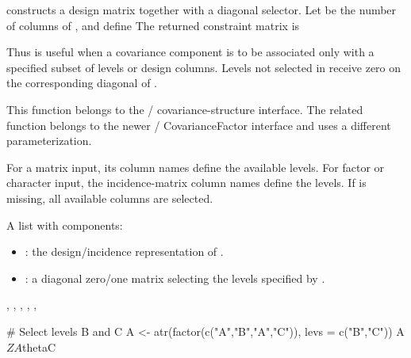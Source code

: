 \documentclass[a4paper]{book}
\begin{document}
\begin{Details}\relax
{} constructs a design matrix  together with a diagonal  selector. Let  be the number of columns of , and define
The returned constraint matrix is

Thus  is useful when a covariance component is to be associated only with a specified subset of levels or design columns. Levels not selected in  receive zero on the corresponding diagonal of .

This function belongs to the / covariance-structure interface. The related  function belongs to the newer / CovarianceFactor interface and uses a different parameterization.

For a matrix input, its column names define the available levels. For factor or character input, the incidence-matrix column names define the levels. If  is missing, all available columns are selected.
\end{Details}
%
\begin{Value}
A list with components:
\begin{itemize}

\item{} : the design/incidence representation of .
\item{} : a diagonal zero/one matrix selecting the levels specified by .

\end{itemize}

\end{Value}
%
\begin{SeeAlso}\relax
{}, , , ,
, 
\end{SeeAlso}
%
\begin{Examples}
\begin{ExampleCode}
# Select levels B and C
A <- atr(factor(c("A","B","A","C")), levs = c("B","C"))
A$Z
A$thetaC
\end{ExampleCode}
\end{Examples}
\end{document}
